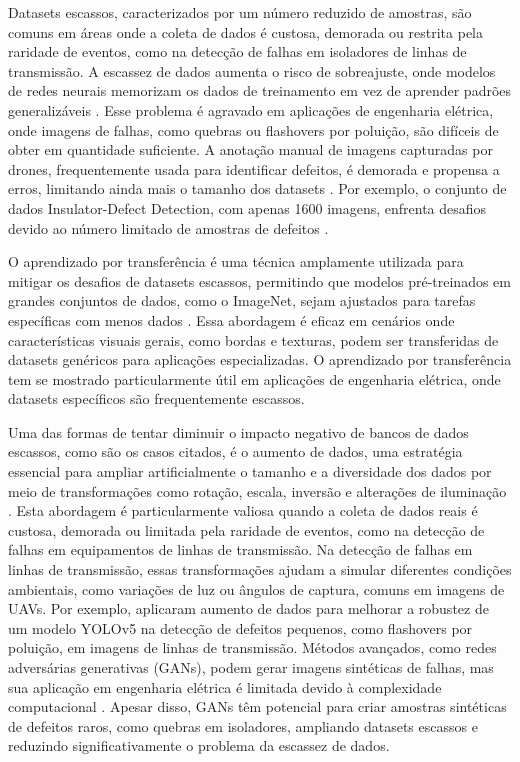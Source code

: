 Datasets escassos, caracterizados por um número reduzido de amostras, são comuns em áreas onde a coleta de dados é custosa, demorada ou restrita pela raridade de eventos, como na detecção de falhas em isoladores de linhas de transmissão. A escassez de dados aumenta o risco de sobreajuste, onde modelos de redes neurais memorizam os dados de treinamento em vez de aprender padrões generalizáveis \cite{goodfellow2016deep}. Esse problema é agravado em aplicações de engenharia elétrica, onde imagens de falhas, como quebras ou flashovers por poluição, são difíceis de obter em quantidade suficiente. A anotação manual de imagens capturadas por drones, frequentemente usada para identificar defeitos, é demorada e propensa a erros, limitando ainda mais o tamanho dos datasets \cite{zheng2022improved}. Por exemplo, o conjunto de dados Insulator-Defect Detection, com apenas 1600 imagens, enfrenta desafios devido ao número limitado de amostras de defeitos \cite{zheng2022improved}.

O aprendizado por transferência é uma técnica amplamente utilizada para mitigar os desafios de datasets escassos, permitindo que modelos pré-treinados em grandes conjuntos de dados, como o ImageNet, sejam ajustados para tarefas específicas com menos dados \cite{pan2010survey}. Essa abordagem é eficaz em cenários onde características visuais gerais, como bordas e texturas, podem ser transferidas de datasets genéricos para aplicações especializadas. O aprendizado por transferência tem se mostrado particularmente útil em aplicações de engenharia elétrica, onde datasets específicos são frequentemente escassos.

Uma das formas de tentar diminuir o impacto negativo de bancos de dados escassos, como são os casos citados, é o aumento de dados, uma estratégia essencial para ampliar artificialmente o tamanho e a diversidade dos dados por meio de transformações como rotação, escala, inversão e alterações de iluminação \cite{shorten2019survey}. Esta abordagem é particularmente valiosa quando a coleta de dados reais é custosa, demorada ou limitada pela raridade de eventos, como na detecção de falhas em equipamentos de linhas de transmissão. Na detecção de falhas em linhas de transmissão, essas transformações ajudam a simular diferentes condições ambientais, como variações de luz ou ângulos de captura, comuns em imagens de UAVs. Por exemplo,  aplicaram aumento de dados para melhorar a robustez de um modelo YOLOv5 na detecção de defeitos pequenos, como flashovers por poluição, em imagens de linhas de transmissão. Métodos avançados, como redes adversárias generativas (GANs), podem gerar imagens sintéticas de falhas, mas sua aplicação em engenharia elétrica é limitada devido à complexidade computacional \cite{goodfellow2014generative}. Apesar disso, GANs têm potencial para criar amostras sintéticas de defeitos raros, como quebras em isoladores, ampliando datasets escassos e reduzindo significativamente o problema da escassez de dados.

